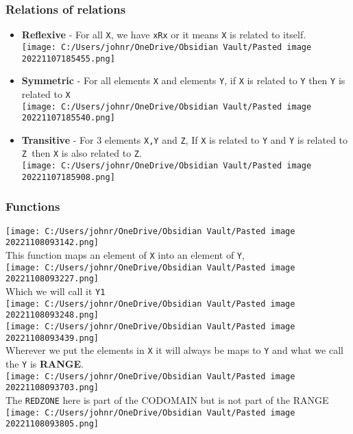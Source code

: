 \documentclass[
]{article}
\providecommand{\tightlist}{%
  \setlength{\itemsep}{0pt}\setlength{\parskip}{0pt}}
\begin{document}
\hypertarget{relations-of-relations}{%
\subsubsection{Relations of relations}\label{relations-of-relations}}

\begin{itemize}
\tightlist
\item
  \textbf{Reflexive} - For all \texttt{X}, we have \texttt{xRx} or it
  means \texttt{X} is related to itself.\\
  \texttt{[image: C:/Users/johnr/OneDrive/Obsidian Vault/Pasted image 20221107185455.png]}
\item
  \textbf{Symmetric} - For all elements \texttt{X} and elements
  \texttt{Y}, if \texttt{X} is related to \texttt{Y} then \texttt{Y} is
  related to \texttt{X}\\
  \texttt{[image: C:/Users/johnr/OneDrive/Obsidian Vault/Pasted image 20221107185540.png]}
\item
  \textbf{Transitive} - For 3 elements \texttt{X,Y} and \texttt{Z}, If
  \texttt{X} is related to \texttt{Y} and \texttt{Y} is related to
  \texttt{Z\ }then \texttt{X} is also related to \texttt{Z}.\\
  \texttt{[image: C:/Users/johnr/OneDrive/Obsidian Vault/Pasted image 20221107185908.png]}
\end{itemize}

\hypertarget{functions}{%
\subsubsection{Functions}\label{functions}}

\texttt{[image: C:/Users/johnr/OneDrive/Obsidian Vault/Pasted image 20221108093142.png]}\\
This function maps an element of \texttt{X} into an element of
\texttt{Y},\\
\texttt{[image: C:/Users/johnr/OneDrive/Obsidian Vault/Pasted image 20221108093227.png]}\\
Which we will call it \texttt{Y1}\\
\texttt{[image: C:/Users/johnr/OneDrive/Obsidian Vault/Pasted image 20221108093248.png]}\\
\texttt{[image: C:/Users/johnr/OneDrive/Obsidian Vault/Pasted image 20221108093439.png]}\\
Wherever we put the elements in \texttt{X} it will always be maps to
\texttt{Y} and what we call the \texttt{Y} is \textbf{RANGE}.\\
\texttt{[image: C:/Users/johnr/OneDrive/Obsidian Vault/Pasted image 20221108093703.png]}\\
The \texttt{REDZONE} here is part of the CODOMAIN but is not part of the
RANGE\\
\texttt{[image: C:/Users/johnr/OneDrive/Obsidian Vault/Pasted image 20221108093805.png]}
\end{document}
